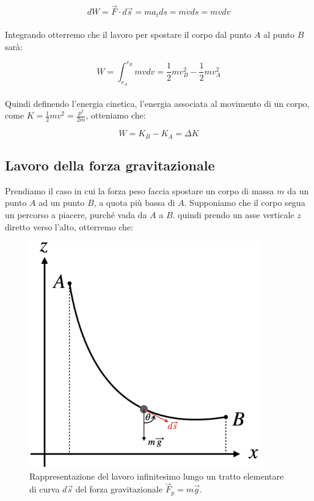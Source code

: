 \begin{equation}
    dW = \vec F\cdot d\vec s = ma_tds = m\dot v ds = mv dv 
\end{equation}
\\
Integrando otterremo che il lavoro per spostare il corpo dal punto $A$ al
punto $B$ sarà:

\begin{equation}
    W = \int_{v_A}^{v_B}mvdv = \frac12mv_B^2- \frac12mv_A^2
\end{equation}
\\
Quindi definendo l'energia cinetica, l'energia associata al movimento di un
corpo, come $K = \frac12 mv^2=\frac{p^2}{2m}$, otteniamo che:

\begin{equation}
    W = K_B - K_A = \Delta K
\label{eq:work&energy:w=dk}
\end{equation}

\subsection{Lavoro della forza gravitazionale}
Prendiamo il caso in cui la forza peso faccia spostare un corpo di massa $m$
da un punto $A$ ad un punto $B$, a quota più bassa di $A$. Supponiamo che il corpo segua un percorso a piacere, purché vada da $A$ a $B$. quindi prendo un asse verticale $z$ diretto verso l'alto, otterremo che:
\begin{figure}[htbp]
    \begin{center}
        \includegraphics[width=10cm]{images/lavorog.png}
        \caption{Rappresentazione del lavoro infinitesimo lungo un tratto
        elementare di curva $d\vec s$ del forza gravitazionale
        $\vec F_p = m\vec g$.}
\end{center}
\label{fig:work&energy:P_work}
\end{figure}

